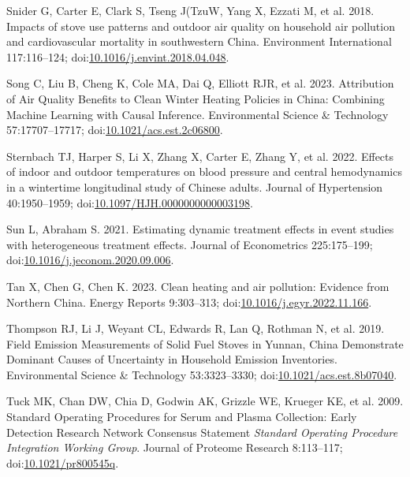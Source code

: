 \documentclass[
  letterpaper,
  DIV=11,
  numbers=noendperiod]{scrartcl}
\newlength{\cslhangindent}
\newlength{\cslentryspacingunit} %
\newenvironment{CSLReferences}[2] %
 {%
  \setlength{\parindent}{0pt}
  \ifodd #1
  \let\oldpar\par
  \def\par{\hangindent=\cslhangindent\oldpar}
  \fi
  \setlength{\parskip}{#2\cslentryspacingunit}
 }%
 {}
\begin{document}
\begin{CSLReferences}{1}{0}
\leavevmode{}%
Snider G, Carter E, Clark S, Tseng J(TzuW, Yang X, Ezzati M, et al.
2018. Impacts of stove use patterns and outdoor air quality on household
air pollution and cardiovascular mortality in southwestern {China}.
Environment International 117:116--124;
doi:\href{https://doi.org/10.1016/j.envint.2018.04.048}{10.1016/j.envint.2018.04.048}.

\leavevmode{}%
Song C, Liu B, Cheng K, Cole MA, Dai Q, Elliott RJR, et al. 2023.
Attribution of {Air Quality Benefits} to {Clean Winter Heating Policies}
in {China}: {Combining Machine Learning} with {Causal Inference}.
Environmental Science \& Technology 57:17707--17717;
doi:\href{https://doi.org/10.1021/acs.est.2c06800}{10.1021/acs.est.2c06800}.

\leavevmode{}%
Sternbach TJ, Harper S, Li X, Zhang X, Carter E, Zhang Y, et al. 2022.
Effects of indoor and outdoor temperatures on blood pressure and central
hemodynamics in a wintertime longitudinal study of {Chinese} adults.
Journal of Hypertension 40:1950--1959;
doi:\href{https://doi.org/10.1097/HJH.0000000000003198}{10.1097/HJH.0000000000003198}.

\leavevmode{}%
Sun L, Abraham S. 2021. Estimating dynamic treatment effects in event
studies with heterogeneous treatment effects. Journal of Econometrics
225:175--199;
doi:\href{https://doi.org/10.1016/j.jeconom.2020.09.006}{10.1016/j.jeconom.2020.09.006}.

\leavevmode{}%
Tan X, Chen G, Chen K. 2023. Clean heating and air pollution: {Evidence}
from {Northern China}. Energy Reports 9:303--313;
doi:\href{https://doi.org/10.1016/j.egyr.2022.11.166}{10.1016/j.egyr.2022.11.166}.

\leavevmode{}%
Thompson RJ, Li J, Weyant CL, Edwards R, Lan Q, Rothman N, et al. 2019.
Field {Emission Measurements} of {Solid Fuel Stoves} in {Yunnan}, {China
Demonstrate Dominant Causes} of {Uncertainty} in {Household Emission
Inventories}. Environmental Science \& Technology 53:3323--3330;
doi:\href{https://doi.org/10.1021/acs.est.8b07040}{10.1021/acs.est.8b07040}.

\leavevmode{}%
Tuck MK, Chan DW, Chia D, Godwin AK, Grizzle WE, Krueger KE, et al.
2009. Standard {Operating Procedures} for {Serum} and {Plasma
Collection}: {Early Detection Research Network Consensus Statement}
{\emph{Standard Operating Procedure Integration Working Group}}. Journal
of Proteome Research 8:113--117;
doi:\href{https://doi.org/10.1021/pr800545q}{10.1021/pr800545q}.


\end{CSLReferences}
\end{document}
